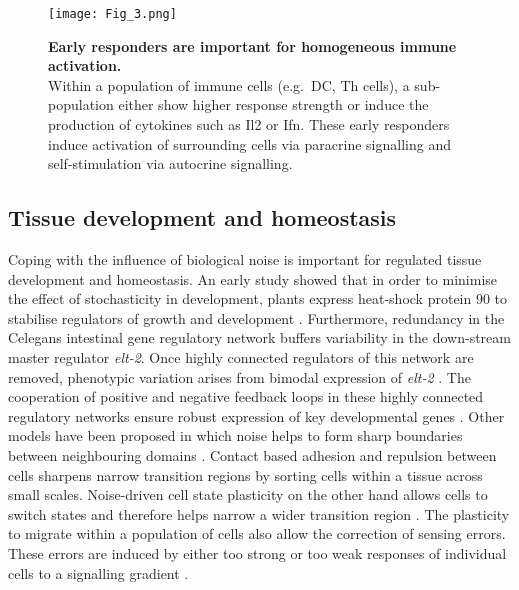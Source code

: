 \begin{figure}[!h]
\centering
\texttt{[image: Fig\_3.png]}
\caption[Early responders are important for homogeneous immune activation]{\textbf{Early responders are important for homogeneous immune activation.}\\
Within a population of immune cells (e.g.~\gls{DC}, \gls{Th} cells), a sub-population either show higher response strength or induce the production of cytokines such as \gls{Il}2 or \gls{Ifn}\textbeta. 
These early responders induce activation of surrounding cells via paracrine signalling and self-stimulation via autocrine signalling.}
\label{fig0:noise_immune}
\end{figure}

\vspace{-5mm}

\subsection{Tissue development and homeostasis}

Coping with the influence of biological noise is important for regulated tissue development and homeostasis. 
An early study showed that in order to minimise the effect of stochasticity in development, plants express heat-shock protein 90 to stabilise regulators of growth and development \citep{Queitsch2002}. 
Furthermore, redundancy in the \Gls{Celegans} intestinal gene regulatory network buffers variability in the down-stream master regulator \textit{elt-2}. 
Once highly connected regulators of this network are removed, phenotypic variation arises from bimodal expression of \textit{elt-2} \citep{Raj2010}. 
The cooperation of positive and negative feedback loops in these highly connected regulatory networks ensure robust expression of key developmental genes \citep{Ji2013}. 
Other models have been proposed in which noise helps to form sharp boundaries between neighbouring domains \citep{Zhang2012}. 
Contact based adhesion and repulsion between cells sharpens narrow transition regions by sorting cells within a tissue across small scales. Noise-driven cell state plasticity on the other hand allows cells to switch states and therefore helps narrow a wider transition region \citep{Wang2017}. 
The plasticity to migrate within a population of cells also allow the correction of sensing errors. These errors are induced by either too strong or too weak responses of individual cells to a signalling gradient \citep{Camley2017}.\\

